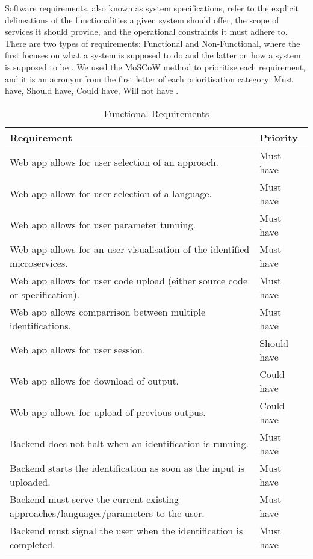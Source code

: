 Software requirements, also known as system specifications, refer to the
explicit delineations of the functionalities a given system should offer, the
scope of services it should provide, and the operational constraints it must
adhere to. There are two types of requirements: Functional and Non-Functional,
where the first focuses on what a system is supposed to do and the latter on
how a system is supposed to be \cite{wiegers2013software}. We used the MoSCoW
method to prioritise each requirement, and it is an acronym from the first
letter of each prioritisation category: Must have, Should have, Could have,
Will not have \cite{brennan2009guide}.

\begin{table}[!htb] \caption{Functional Requirements} \label{tab:functional-requirements}
  \begin{center}
    \begin{tabular}[c]{p{16em}|p{8em}}
      \textbf{Requirement} &
      \textbf{Priority} \\
      \hline Web app allows for user selection of an approach. & {Must have} \\
      \hline Web app allows for user selection of a language. & {Must have} \\
      \hline Web app allows for user parameter tunning. & {Must have} \\
      \hline Web app allows for an user visualisation of the identified microservices. & {Must have} \\
      \hline Web app allows for user code upload (either source code or specification). & {Must have} \\
      \hline Web app allows comparrison between multiple identifications. & {Must have} \\
      \hline Web app allows for user session. & {Should have} \\
      \hline Web app allows for download of output. & {Could have} \\
      \hline Web app allows for upload of previous outpus. & {Could have} \\
      \hline Backend does not halt when an identification is running. & {Must have} \\
      \hline Backend starts the identification as soon as the input is uploaded. & {Must have} \\
      \hline Backend must serve the current existing approaches/languages/parameters to the user. & {Must have} \\
      \hline Backend must signal the user when the identification is completed. & {Must have} \\

\end{tabular}
\end{center}
\end{table}

